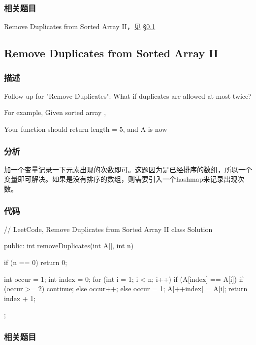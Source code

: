 \subsubsection{相关题目}

\begindot
\item Remove Duplicates from Sorted Array II，见 \S \ref{sec:remove-duplicates-from-sorted-array-ii}
\myenddot


\subsection{Remove Duplicates from Sorted Array II}
\label{sec:remove-duplicates-from-sorted-array-ii}


\subsubsection{描述}
Follow up for "Remove Duplicates":
What if duplicates are allowed at most twice?

For example,
Given sorted array ,

Your function should return length = 5, and A is now \code{[1,1,2,2,3]}


\subsubsection{分析}
加一个变量记录一下元素出现的次数即可。这题因为是已经排序的数组，所以一个变量即可解决。如果是没有排序的数组，则需要引入一个hashmap来记录出现次数。


\subsubsection{代码}
\begin{Code}
// LeetCode, Remove Duplicates from Sorted Array II
class Solution {
public:
    int removeDuplicates(int A[], int n) {
        if (n == 0) return 0;

        int occur = 1;
        int index = 0;
        for (int i = 1; i < n; i++) {
            if (A[index] == A[i]) {
                if (occur >= 2) continue;
                else occur++;
            } else {
                occur = 1;
            }
            A[++index] = A[i];
        }
        return index + 1;
    }
};
\end{Code}


\subsubsection{相关题目}

